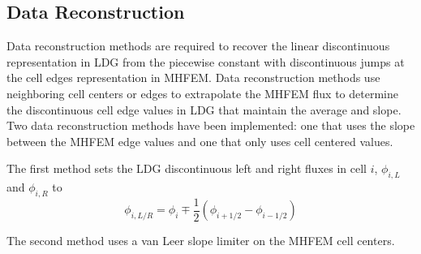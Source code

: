 \subsection{Data Reconstruction}
	Data reconstruction methods are required to recover the linear discontinuous representation in LDG from the piecewise constant with discontinuous jumps at the cell edges representation in MHFEM. Data reconstruction methods use neighboring cell centers or edges to extrapolate the MHFEM flux to determine the discontinuous cell edge values in LDG that maintain the average and slope. Two data reconstruction methods have been implemented: one that uses the slope between the MHFEM edge values and one that only uses cell centered values. 

	The first method sets the LDG discontinuous left and right fluxes in cell $i$, $\phi_{i,L}$ and $\phi_{i,R}$ to 
		\begin{equation}
			\phi_{i,L/R} = \phi_i \mp \frac{1}{2} \left(\phi_{i+1/2} - \phi_{i-1/2}\right)
		\end{equation}

	The second method uses a van Leer slope limiter on the MHFEM cell centers. 